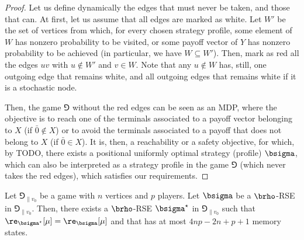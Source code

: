 \begin{proof}
    Let us define dynamically the edges that must never be taken, and those that can.
    At first, let us assume that all edges are marked as white.
    Let $W'$ be the set of vertices from which, for every chosen strategy profile, some element of $W$ has nonzero probability to be visited, or some payoff vector of $Y$ has nonzero probability to be achieved (in particular, we have $W \subseteq W'$).
    Then, mark as red all the edges $uv$ with $u \not\in W'$ and $v \in W$.
    Note that any $u \not\in W$ has, still, one outgoing edge that remains white, and all outgoing edges that remains white if it is a stochastic node.

    Then, the game $\Game$ without the red edges can be seen as an MDP, where the objective is to reach one of the terminals associated to a payoff vector belonging to $X$ (if $\bar{0} \not\in X$) or to avoid the terminals associated to a payoff that does not belong to $X$ (if $\bar{0} \in X$).
    It is, then, a reachability or a safety objective, for which, by TODO, there exists a positional uniformly optimal strategy (profile) $\bsigma$, which can also be interpreted as a strategy profile in the game $\Game$ (which never takes the red edges), which satisfies our requirements.
\end{proof}

\begin{lemma} \label{lm:rse_finite_memory}
    Let $\Game_{\|v_0}$ be a game with $n$ vertices and $p$ players.
    Let $\bsigma$ be a $\brho$-RSE in $\Game_{\|v_0}$.
    Then, there exists a $\brho$-RSE $\bsigma^\star$ in $\Game_{\|v_0}$ such that $\re_{\bsigma^\star}[\mu] = \re_{\bsigma}[\mu]$ and that has at most $4np -2n + p + 1$ memory states.
\end{lemma}

